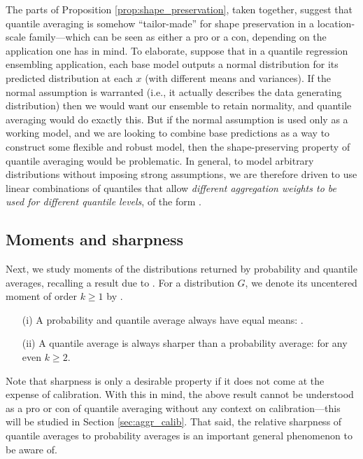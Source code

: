 \documentclass{article}
\begin{document}
The parts of Proposition \ref{prop:shape_preservation}, taken together, suggest
that quantile averaging is somehow ``tailor-made'' for shape preservation in a
location-scale family---which can be seen as either a pro or a con, depending on
the application one has in mind. To elaborate, suppose that in a quantile
regression ensembling application, each base model outputs a normal distribution
for its predicted distribution at each $x$ (with different means and
variances). If the normal assumption is warranted (i.e., it actually describes
the data generating distribution) then we would want our ensemble to retain 
normality, and quantile averaging would do exactly this. But if the normal
assumption is used only as a working model, and we are looking to combine base
predictions as a way to construct some flexible and robust model, then the
shape-preserving property of quantile averaging would be problematic. In
general, to model arbitrary distributions without imposing strong assumptions,
we are therefore driven to use linear combinations of quantiles that allow 
\emph{different aggregation weights to be used for different quantile levels}, 
of the form . 

\subsection{Moments and sharpness}

Next, we study moments of the distributions returned by probability and quantile
averages, recalling a result due to \citet{lichtendahl2013better}. For a
distribution $G$, we denote its uncentered moment of order $k \geq 1$ by
.  

\begin{proposition}
\label{prop:moments_sharpness} \hfill
\begin{itemize}
\item[(i)] A probability and quantile average always have equal means:
  .  
\item[(ii)] A quantile average is always sharper than a probability average:
   for any even $k \geq 2$.   
\end{itemize}
\end{proposition}

Note that sharpness is only a desirable property if it does not come at the
expense of calibration. With this in mind, the above result cannot be understood
as a pro or con of quantile averaging without any context on calibration---this
will be studied in Section \ref{sec:aggr_calib}. That said, the relative
sharpness of quantile averages to probability averages is an important general
phenomenon to be aware of.  
\end{document}
